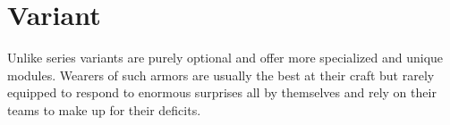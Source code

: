 \documentclass[12pt,a4paper,openany]{book}
\begin{document}
    \section{Variant}
    Unlike series variants are purely optional and offer more specialized and unique modules. Wearers of such armors are usually the best at their craft but rarely equipped to respond to enormous surprises all by themselves and rely on their teams to make up for their deficits.
    
    \begin{multicols}{2}
    \end{multicols}
    
\end{document}
